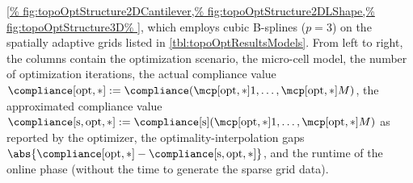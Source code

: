 \begin{table}
{    \cref{%
      fig:topoOptStructure2DCantilever,%
      fig:topoOptStructure2DLShape,%
      fig:topoOptStructure3D%
    }, which employs cubic B-splines ($p = 3$) on the spatially
    adaptive grids listed in \cref{tbl:topoOptResultsModels}.
    From left to right, the columns contain
    the optimization scenario,
    the micro-cell model,
    the number of optimization iterations,
    the actual compliance value
    $\trcmp := \compliance(\mcpoptappr{1}, \dotsc, \mcpoptappr{M})$,
    the approximated compliance value
    $\apcmp := \complianceintp(\mcpoptappr{1}, \dotsc, \mcpoptappr{M})$
    as reported by the optimizer,
    the optimality-interpolation gaps $\abs{\trcmp - \apcmp}$, and
    the runtime of the online phase
    (without the time to generate the sparse grid data).%
  }%
  \label{tbl:topoOptResultsDetailed}%
\end{table}

